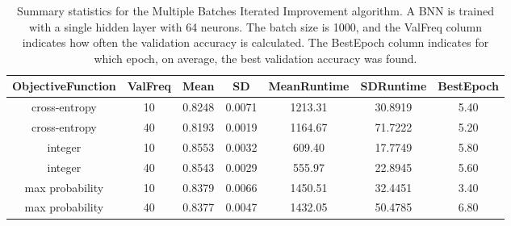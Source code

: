 \begin{center}
\begin{table}[H]
\centering
\begin{tabular}{|c|c|c|c|c|c|c|}
  \hline
ObjectiveFunction & ValFreq & Mean & SD & MeanRuntime & SDRuntime & BestEpoch \\ 
  \hline
cross-entropy &  10 & 0.8248 & 0.0071 & 1213.31 & 30.8919 & 5.40 \\ 
   \hline
cross-entropy &  40 & 0.8193 & 0.0019 & 1164.67 & 71.7222 & 5.20 \\ 
   \hline
integer &  10 & 0.8553 & 0.0032 & 609.40 & 17.7749 & 5.80 \\ 
   \hline
integer &  40 & 0.8543 & 0.0029 & 555.97 & 22.8945 & 5.60 \\ 
   \hline
max probability &  10 & 0.8379 & 0.0066 & 1450.51 & 32.4451 & 3.40 \\ 
   \hline
max probability &  40 & 0.8377 & 0.0047 & 1432.05 & 50.4785 & 6.80 \\ 
   \hline
\end{tabular}
\caption{Summary statistics for the Multiple Batches Iterated Improvement algorithm.
          A BNN is trained with a single hidden layer with
          64 neurons. The batch size is 1000, and the ValFreq column indicates how often the validation accuracy
          is calculated. The BestEpoch column indicates for which epoch, on average, the best validation accuracy
          was found.} 
\label{Early stopping}
\end{table}

\end{center}
